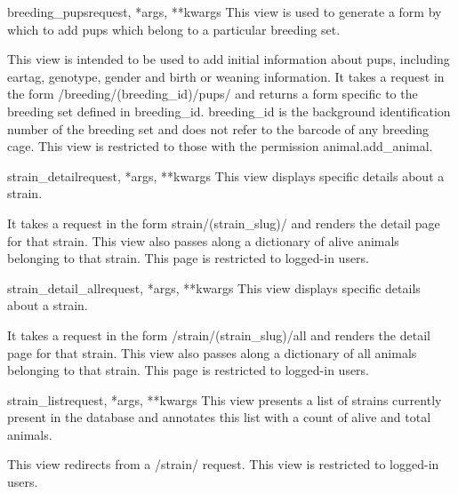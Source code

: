 \documentclass[letterpaper,10pt,english]{sphinxmanual}
\begin{document}
\hypertarget{animal.views.breeding\_pups}{}\begin{funcdesc}{breeding\_pups}{request, *args, **kwargs}
This view is used to generate a form by which to add pups which belong to a particular breeding set.

This view is intended to be used to add initial information about pups, including eartag, genotype, gender and birth or weaning information.
It takes a request in the form /breeding/(breeding\_id)/pups/ and returns a form specific to the breeding set defined in breeding\_id.  breeding\_id is the background identification number of the breeding set and does not refer to the barcode of any breeding cage.
This view is restricted to those with the permission animal.add\_animal.
\end{funcdesc}

\hypertarget{animal.views.strain\_detail}{}\begin{funcdesc}{strain\_detail}{request, *args, **kwargs}
This view displays specific details about a strain.

It takes a request in the form strain/(strain\_slug)/ and renders the detail page for that strain.
This view also passes along a dictionary of alive animals belonging to that strain.
This page is restricted to logged-in users.
\end{funcdesc}

\hypertarget{animal.views.strain\_detail\_all}{}\begin{funcdesc}{strain\_detail\_all}{request, *args, **kwargs}
This view displays specific details about a strain.

It takes a request in the form /strain/(strain\_slug)/all and renders the detail page for that strain.
This view also passes along a dictionary of all animals belonging to that strain.
This page is restricted to logged-in users.
\end{funcdesc}

\hypertarget{animal.views.strain\_list}{}\begin{funcdesc}{strain\_list}{request, *args, **kwargs}
This view presents a list of strains currently present in the database and annotates this list with a count of alive and total animals.

This view redirects from a /strain/ request.
This view is restricted to logged-in users.
\end{funcdesc}
\hypertarget{module-animal.urls}{}
\modulesynopsis{}
\end{document}
